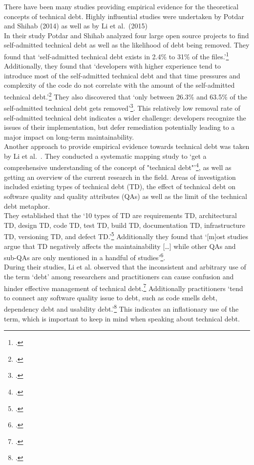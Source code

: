 There have been many studies providing empirical evidence for the theoretical concepts of technical debt. Highly influential studies were undertaken by Potdar and Shihab (2014) as well as by Li et al.\ (2015)\\
In their study Potdar and Shihab analyzed four large open source projects to find self-admitted technical debt as well as the likelihood of debt being removed. They found that `self-admitted technical debt exists in 2.4\% to 31\% of the files.'\footcite[1]{potdarExploratoryStudySelfAdmitted2014}
Additionally, they found that `developers with higher experience tend to introduce most of the self-admitted technical debt and that time pressures and complexity of the code do not correlate with the amount of the self-admitted technical debt.'\footcite[1]{potdarExploratoryStudySelfAdmitted2014}
They also discovered that `only between 26.3\% and 63.5\% of the self-admitted technical debt gets removed'\footcite[1]{potdarExploratoryStudySelfAdmitted2014}. This relatively low removal rate of self-admitted technical debt indicates a wider challenge:
developers recognize the issues of their implementation, but defer remediation potentially leading to a major impact on long-term maintainability.\\
Another approach to provide empirical evidence towards technical debt was taken by Li et al.\ . They conducted a systematic mapping study to `get a comprehensive understanding of the concept of "technical debt"'\footcite[194]{liSystematicMappingStudy2015}, as well as getting an overview of the current research in the field.
Areas of investigation included existing types of technical debt (TD), the effect of technical debt on software quality and quality attributes (QAs) as well as the limit of the technical debt metaphor.\\
They established that the `10 types of TD are requirements TD, architectural TD, design TD, code TD, test TD, build TD, documentation TD, infrastructure TD, versioning TD, and defect TD.'\footcite[215]{liSystematicMappingStudy2015}
Additionally they found that `[m]ost studies argue that TD negatively affects the maintainability [\ldots] while other QAs and sub-QAs are only mentioned in a handful of studies'\footcite[215]{liSystematicMappingStudy2015}.\\
During their studies,  Li et al. observed that the inconsistent and arbitrary use of the term `debt' among researchers and practitioners can cause confusion and hinder effective management of technical debt.\footcite[211]{liSystematicMappingStudy2015} Additionally practitioners `tend to connect any software quality issue to debt, such as code smells debt, dependency debt and usability debt.'\footcite[212]{liSystematicMappingStudy2015}
This indicates an inflationary use of the term, which is important to keep in mind when speaking about technical debt.\\

